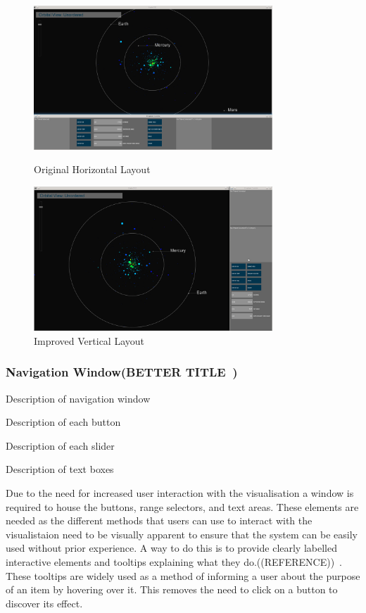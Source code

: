 \begin{figure}[h!]
  \centering
      \includegraphics[width=0.8\textwidth]{images/layout_horizontal.jpg}
  \caption{Original Horizontal Layout}  
        \includegraphics[width=0.8\textwidth]{images/layout_vertical.jpg}
  \caption{Improved Vertical Layout}
\end{figure}

\subsubsection{Navigation Window(BETTER TITLE~)}
Description of navigation window

Description of each button

Description of each slider

Description of text boxes

Due to the need for increased user interaction with the visualisation a window is required to house the buttons, range selectors, and text areas. These elements are needed as the different methods that users can use to interact with the visualistaion need to be visually apparent to ensure that the system can be easily used without prior experience. A way to do this is to provide clearly labelled interactive elements and tooltips explaining what they do.((REFERENCE))~. These tooltips are widely used as a method of informing a user about the purpose of an item by hovering over it. This removes the need to click on a button to discover its effect.

